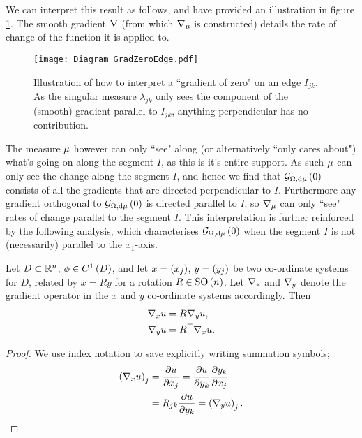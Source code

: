 We can interpret this result as follows, and have provided an illustration in figure \ref{fig:GradZeroEdge}.
The smooth gradient $\nabla$ (from which $\nabla_\mu$ is constructed) details the rate of change of the function it is applied to.
\begin{figure}[b]
	\centering
	\texttt{[image: Diagram\_GradZeroEdge.pdf]}
	\caption{\label{fig:GradZeroEdge} Illustration of how to interpret a ``gradient of zero" on an edge $I_{jk}$. As the singular measure $\lambda_{jk}$ only sees the component of the (smooth) gradient parallel to $I_{jk}$, anything perpendicular has no contribution.}
\end{figure}
The measure $\mu$ however can only ``see" along (or alternatively ``only cares about") what's going on along the segment $I$, as this is it's entire support.
As such $\mu$ can only see the change along the segment $I$, and hence we find that $\mathcal{G}_{ \Omega, \mathrm{d}\mu}\left( 0 \right)$ consists of all the gradients that are directed perpendicular to $I$.
Furthermore any gradient orthogonal to $\mathcal{G}_{ \Omega, \mathrm{d}\mu}\left( 0 \right)$ is directed parallel to $I$, so $\nabla_\mu$ can only ``see" rates of change parallel to the segment $I$.
This interpretation is further reinforced by the following analysis, which characterises $\mathcal{G}_{ \Omega, \mathrm{d}\mu}\left( 0 \right)$ when the segment $I$ is not (necessarily) parallel to the $x_1$-axis. \newline

\begin{lemma} \label{lem:SmoothGradientsUnderRotation}
	Let $D\subset\mathbb{R}^n$, $\phi\in C^1\left( D \right)$, and let $x=\left( x_j \right)$, $y=\left( y_j \right)$ be two co-ordinate systems for $D$, related by $x=Ry$ for a rotation $R\in\mathrm{SO}\left( n \right)$.
	Let $\nabla_x$ and $\nabla_y$ denote the gradient operator in the $x$ and $y$ co-ordinate systems accordingly.
	Then
	\begin{align*}
		\nabla_x u &= R \nabla_y u, \\
		\nabla_y u &= R^{\top} \nabla_x u.
	\end{align*}
\end{lemma}
\begin{proof}
	We use index notation to save explicitly writing summation symbols;
	\begin{align*}
		\left( \nabla_x u \right)_j &= \dfrac{\partial u}{\partial x_j} = \dfrac{\partial u}{\partial y_k}\dfrac{\partial y_k}{\partial x_j} \\
		&= R_{jk}\dfrac{\partial u}{\partial y_k} = \left( \nabla_y u \right)_j.
	\end{align*}
\end{proof}

